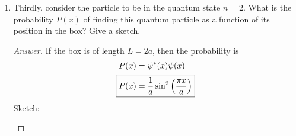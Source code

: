 \documentclass[../psets.tex]{subfiles}
\begin{document}
\begin{enumerate}
\begin{enumerate}
\begin{proof}[Answer]
\begin{center}
            \end{center}
        \end{proof}
        \item Thirdly, consider the particle to be in the quantum state $n=2$. What is the probability $P(x)$ of finding this quantum particle as a function of its position in the box? Give a sketch.
        \begin{proof}[Answer]
            If the box is of length $L=2a$, then the probability is
            \begin{align*}
                P(x) &= \psi^*(x)\psi(x)\\
                \Aboxed{P(x) &= \frac{1}{a}\sin^2\left( \frac{\pi x}{a} \right)}
            \end{align*}
            Sketch:
            \begin{center}
\end{center}
\end{proof}
\end{enumerate}
\end{enumerate}
\end{document}
